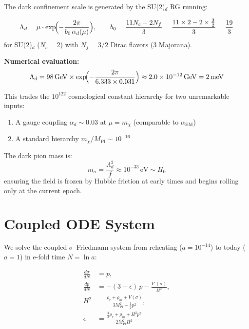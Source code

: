 \documentclass[11pt,a4paper]{article}
\newcommand{\Mpl}{M_{\mathrm{Pl}}}
\newcommand{\Ld}{\Lambda_d}
\newcommand{\meV}{\,\mathrm{meV}}
\newcommand{\GeV}{\,\mathrm{GeV}}
\begin{document}
The dark confinement scale is generated by the SU(2)$_d$ RG running:

\begin{equation}\label{eq:transmutation}
  \Ld = \mu \cdot \exp\!\Bigl(-\frac{2\pi}{b_0\,\alpha_d(\mu)}\Bigr),
  \qquad b_0 = \frac{11 N_c - 2 N_f}{3} = \frac{11\times 2 - 2\times\tfrac{3}{2}}{3} = \frac{19}{3}
\end{equation}
for SU(2)$_d$ ($N_c = 2$) with $N_f = 3/2$ Dirac flavors (3 Majorana).

\medskip
\noindent
\textbf{Numerical evaluation:}
\begin{equation}
  \Ld = 98\GeV \times \exp\!\Bigl(-\frac{2\pi}{6.333 \times 0.031}\Bigr)
  \approx 2.0 \times 10^{-12}\GeV = 2\meV
\end{equation}

This trades the $10^{122}$ cosmological constant hierarchy for two unremarkable inputs:
\begin{enumerate}[nosep]
  \item A gauge coupling $\alpha_d \sim 0.03$ at $\mu = m_\chi$ (comparable to $\alpha_{\mathrm{EM}}$)
  \item A standard hierarchy $m_\chi/\Mpl \sim 10^{-16}$
\end{enumerate}

The dark pion mass is:
\begin{equation}
  m_\sigma = \frac{\Ld^2}{f} \approx 10^{-33}\,\text{eV} \sim H_0
\end{equation}
ensuring the field is frozen by Hubble friction at early times and begins rolling only
at the current epoch.

\section{Coupled ODE System}
\label{sec:ode}

We solve the coupled $\sigma$--Friedmann system from reheating ($a = 10^{-14}$) to today ($a = 1$)
in e-fold time $N = \ln a$:

\begin{align}
  \frac{d\sigma}{dN} &= p, \label{eq:dsigma}\\[3pt]
  \frac{dp}{dN} &= -(3-\epsilon)\,p - \frac{V'(\sigma)}{H^2}, \label{eq:dp}\\[3pt]
  H^2 &= \frac{\rho_r + \rho_m + V(\sigma)}{3\Mpl^2 - \tfrac{1}{2}p^2}, \label{eq:friedmann}\\[3pt]
  \epsilon &= \frac{\tfrac{4}{3}\rho_r + \rho_m + H^2 p^2}{2\Mpl^2 H^2} \label{eq:epsilon}
\end{align}
\end{document}
